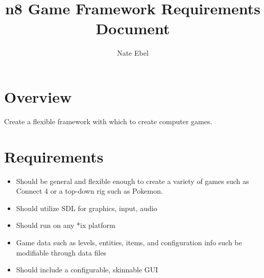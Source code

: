 \documentclass[12pt]{article}
\begin{document}
\title{n8 Game Framework Requirements Document}
\author{Nate Ebel}

\maketitle

\tableofcontents


\section{Overview}
	Create a flexible framework with which to create computer games.

\section{Requirements}
\begin{itemize}
	\item{Should be general and flexible enough to create a variety of games such as Connect 4 or a top-down rig such as 	Pokemon.}
	\item{Should utilize SDL for graphics, input, audio}
	\item{Should run on any *ix platform}
	\item{Game data such as levels, entities, items, and configuration info such be modifiable through data files  }
	\item{Should include a configurable, skinnable GUI}
\end{itemize}
	
\end{document}
